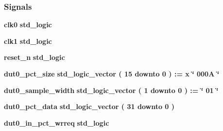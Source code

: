 \subsubsection*{Signals}
 \begin{DoxyCompactItemize}
\item 
{\bf clk0} {\bfseries \textcolor{comment}{std\+\_\+logic}\textcolor{vhdlchar}{ }} 
\item 
{\bf clk1} {\bfseries \textcolor{comment}{std\+\_\+logic}\textcolor{vhdlchar}{ }} 
\item 
{\bf reset\+\_\+n} {\bfseries \textcolor{comment}{std\+\_\+logic}\textcolor{vhdlchar}{ }} 
\item 
{\bf dut0\+\_\+pct\+\_\+size} {\bfseries \textcolor{comment}{std\+\_\+logic\+\_\+vector}\textcolor{vhdlchar}{ }\textcolor{vhdlchar}{(}\textcolor{vhdlchar}{ }\textcolor{vhdlchar}{ } \textcolor{vhdldigit}{15} \textcolor{vhdlchar}{ }\textcolor{keywordflow}{downto}\textcolor{vhdlchar}{ }\textcolor{vhdlchar}{ } \textcolor{vhdldigit}{0} \textcolor{vhdlchar}{ }\textcolor{vhdlchar}{)}\textcolor{vhdlchar}{ }\textcolor{vhdlchar}{ }\textcolor{vhdlchar}{ }\textcolor{vhdlchar}{\+:}\textcolor{vhdlchar}{=}\textcolor{vhdlchar}{ }\textcolor{vhdlchar}{ }\textcolor{vhdlchar}{x}\textcolor{vhdlchar}{ }\textcolor{keyword}{\char`\"{} 000\+A \char`\"{}}\textcolor{vhdlchar}{ }} 
\item 
{\bf dut0\+\_\+sample\+\_\+width} {\bfseries \textcolor{comment}{std\+\_\+logic\+\_\+vector}\textcolor{vhdlchar}{ }\textcolor{vhdlchar}{(}\textcolor{vhdlchar}{ }\textcolor{vhdlchar}{ } \textcolor{vhdldigit}{1} \textcolor{vhdlchar}{ }\textcolor{keywordflow}{downto}\textcolor{vhdlchar}{ }\textcolor{vhdlchar}{ } \textcolor{vhdldigit}{0} \textcolor{vhdlchar}{ }\textcolor{vhdlchar}{)}\textcolor{vhdlchar}{ }\textcolor{vhdlchar}{ }\textcolor{vhdlchar}{ }\textcolor{vhdlchar}{\+:}\textcolor{vhdlchar}{=}\textcolor{vhdlchar}{ }\textcolor{vhdlchar}{ }\textcolor{vhdlchar}{ }\textcolor{vhdlchar}{ }\textcolor{keyword}{\char`\"{} 01 \char`\"{}}\textcolor{vhdlchar}{ }} 
\item 
{\bf dut0\+\_\+pct\+\_\+data} {\bfseries \textcolor{comment}{std\+\_\+logic\+\_\+vector}\textcolor{vhdlchar}{ }\textcolor{vhdlchar}{(}\textcolor{vhdlchar}{ }\textcolor{vhdlchar}{ } \textcolor{vhdldigit}{31} \textcolor{vhdlchar}{ }\textcolor{keywordflow}{downto}\textcolor{vhdlchar}{ }\textcolor{vhdlchar}{ } \textcolor{vhdldigit}{0} \textcolor{vhdlchar}{ }\textcolor{vhdlchar}{)}\textcolor{vhdlchar}{ }} 
\item 
{\bf dut0\+\_\+in\+\_\+pct\+\_\+wrreq} {\bfseries \textcolor{comment}{std\+\_\+logic}\textcolor{vhdlchar}{ }} 

\end{DoxyCompactItemize}
